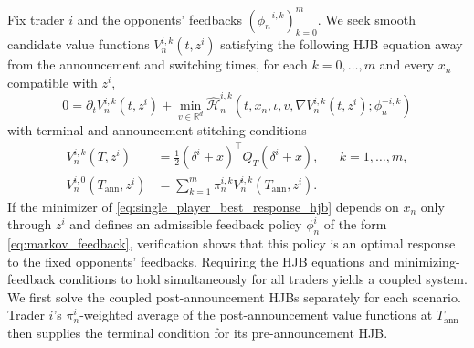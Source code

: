 \documentclass[12pt]{article}
\numberwithin{equation}{section}
\theoremstyle{definition}
\begin{document}
Fix trader \(i\) and the opponents' feedbacks
\((\phi_n^{-i,k})_{k=0}^m\). We seek smooth candidate value functions
\(V_n^{i,k}(t,z^i)\) satisfying the following HJB equation away from the
announcement and switching times, for each
\(k=0,\ldots,m\) and every \(x_n\) compatible with \(z^i\),
\begin{equation}\label{eq:single_player_best_response_hjb}
0
=
\partial_tV_n^{i,k}(t,z^i)
+\min_{v\in\mathbb R^d}
\widehat{\mathscr H}_n^{i,k}\left(
t,x_n,\iota,v,
\nabla V_n^{i,k}(t,z^i);\phi_n^{-i,k}
\right)
\end{equation}
with terminal and announcement-stitching conditions
\[
\begin{aligned}
V_n^{i,k}(T,z^i)
&=\frac{1}{2}(\delta^i+\bar x)^\top Q_T(\delta^i+\bar x),
&&k=1,\ldots,m,\\
V_n^{i,0}(T_{\mathrm{ann}},z^i)
&=\sum_{k=1}^m\pi_n^{i,k}V_n^{i,k}(T_{\mathrm{ann}},z^i).
\end{aligned}
\]
If the minimizer of \eqref{eq:single_player_best_response_hjb} depends on
\(x_n\) only through \(z^i\) and defines an admissible feedback policy
\(\phi_n^i\) of the form \eqref{eq:markov_feedback}, verification shows that
this policy is an optimal response to the fixed opponents' feedbacks.
Requiring the HJB equations and minimizing-feedback conditions to hold
simultaneously for all traders yields a coupled system. We first solve the
coupled post-announcement HJBs separately for each scenario. Trader \(i\)'s
\(\pi_n^i\)-weighted average of the post-announcement value functions at
\(T_{\mathrm{ann}}\) then supplies the terminal condition for its
pre-announcement HJB.
\end{document}
